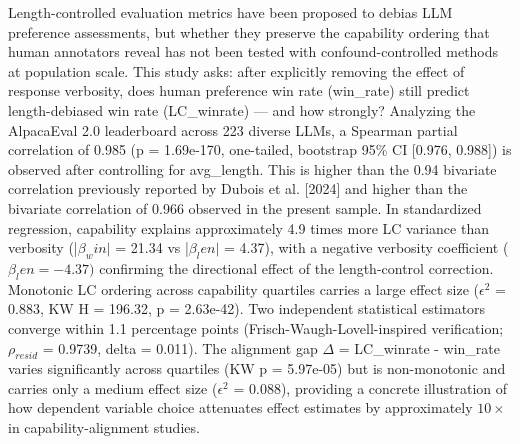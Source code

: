 
Length-controlled evaluation metrics have been proposed to debias LLM preference assessments, but whether they preserve the capability ordering that human annotators reveal has not been tested with confound-controlled methods at population scale. This study asks: after explicitly removing the effect of response verbosity, does human preference win rate (win\_rate) still predict length-debiased win rate (LC\_winrate) --- and how strongly? Analyzing the AlpacaEval 2.0 leaderboard across 223 diverse LLMs, a Spearman partial correlation of 0.985 (p = 1.69e-170, one-tailed, bootstrap 95\% CI [0.976, 0.988]) is observed after controlling for avg\_length. This is higher than the 0.94 bivariate correlation previously reported by Dubois et al. [2024] and higher than the bivariate correlation of 0.966 observed in the present sample. In standardized regression, capability explains approximately 4.9 times more LC variance than verbosity (|$\beta _win|$ = 21.34 vs |$\beta _len|$ = 4.37), with a negative verbosity coefficient ($\beta _len = -4.37)$ confirming the directional effect of the length-control correction. Monotonic LC ordering across capability quartiles carries a large effect size ($\epsilon ^2$ = 0.883, KW H = 196.32, p = 2.63e-42). Two independent statistical estimators converge within 1.1 percentage points (Frisch-Waugh-Lovell-inspired verification; $\rho_{resid}$ = 0.9739, delta = 0.011). The alignment gap $\Delta$ = LC\_winrate - win\_rate varies significantly across quartiles (KW p = 5.97e-05) but is non-monotonic and carries only a medium effect size ($\epsilon ^2$ = 0.088), providing a concrete illustration of how dependent variable choice attenuates effect estimates by approximately $10\times$ in capability-alignment studies.

